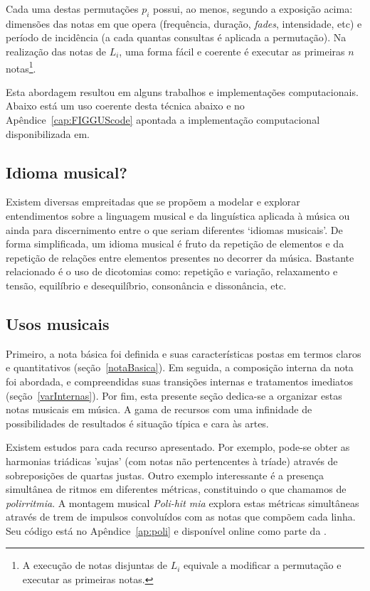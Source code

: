 Cada uma destas permutações
$p_i$ possui, ao menos, segundo a exposição acima: dimensões das notas em que opera (frequência, duração, \emph{fades}, intensidade, etc) e período de incidência (a cada quantas consultas é aplicada a permutação). Na realização das notas de $L_i$, uma forma fácil e coerente é executar as primeiras $n$ notas\footnote{A execução de notas disjuntas de $L_i$ equivale a modificar a permutação e executar as primeiras notas.}.

Esta abordagem resultou em alguns trabalhos e implementações computacionais.\cite{figgusOriginal,figgusEspacializacao} Abaixo está um uso coerente desta técnica abaixo e no Apêndice~\ref{cap:FIGGUScode} apontada a implementação computacional disponibilizada em.\cite{MASSA}

\subsection{Idioma musical?}

Existem diversas empreitadas que se propõem a modelar e explorar entendimentos
sobre a linguagem musical e da linguística aplicada à música ou ainda
para discernimento entre 
o que seriam diferentes
`idiomas musicais'.\cite{Lerdahl, Harmonia, Salzer,Alfaix}
De forma simplificada, um idioma musical é fruto da
repetição de elementos e da repetição de relações entre elementos presentes no decorrer da música. Bastante relacionado é o uso de dicotomias 
como: repetição e variação, relaxamento e tensão, equilíbrio e desequilíbrio, consonância e dissonância, etc. 

\subsection{Usos musicais}

Primeiro, a nota básica foi definida e suas características postas em termos
claros e quantitativos (seção~\ref{notaBasica}). Em seguida, a composição interna da nota foi abordada, e compreendidas suas transições internas e tratamentos imediatos (seção~\ref{varInternas}). Por fim, esta presente seção dedica-se a organizar estas notas musicais em música.
A gama de recursos com uma infinidade de possibilidades de resultados
é situação típica e cara às artes.\cite{Harmonia,Webern}

Existem estudos para cada recurso apresentado. Por exemplo, pode-se obter as harmonias triádicas 'sujas' (com notas não pertencentes à tríade) através de sobreposições de quartas justas. Outro exemplo interessante é a presença simultânea de ritmos em diferentes métricas, constituindo o que chamamos de \emph{polirritmia}. A montagem musical \emph{Poli-hit mia} explora estas métricas simultâneas através de trem de impulsos convoluídos com as notas que compõem cada linha. Seu código está no Apêndice~\ref{ap:poli} e disponível online como parte da \massa.


